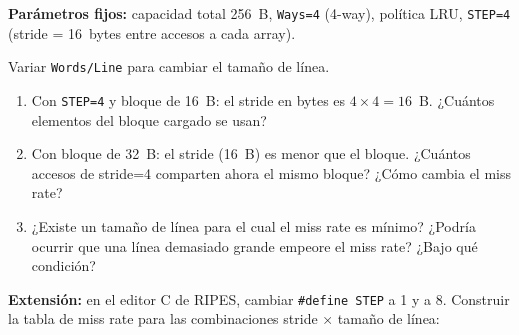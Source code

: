\documentclass[12pt, a4paper]{article}
\newcommand{\ripesbtn}[1]{\texttt{#1}}
\begin{document}
\begin{ejercicio}
    \textbf{Parámetros fijos:} capacidad total 256~B, \texttt{Ways=4} (4-way),
    política LRU, \texttt{STEP=4} (stride = 16~bytes entre accesos a cada array).

    Variar \ripesbtn{Words/Line} para cambiar el tamaño de línea.

    \vspace{0.3cm}
    \begin{center}
    \renewcommand{\arraystretch}{1.8}
    \end{center}

    \vspace{0.2cm}
    \begin{enumerate}
        \item Con \texttt{STEP=4} y bloque de 16~B: el stride en bytes es
              $4\times4=16$~B. ¿Cuántos elementos del bloque cargado se usan?
        \item Con bloque de 32~B: el stride (16~B) es menor que el bloque.
              ¿Cuántos accesos de stride=4 comparten ahora el mismo bloque?
              ¿Cómo cambia el miss rate?
        \item ¿Existe un tamaño de línea para el cual el miss rate es mínimo?
              ¿Podría ocurrir que una línea demasiado grande empeore el miss
              rate? ¿Bajo qué condición?
    \end{enumerate}
\end{ejercicio}

\vspace{0.4cm}
\textbf{Extensión:} en el editor C de RIPES, cambiar \texttt{\#define STEP} a 1 y a 8.
Construir la tabla de miss rate para las combinaciones stride × tamaño de línea:
\end{document}
